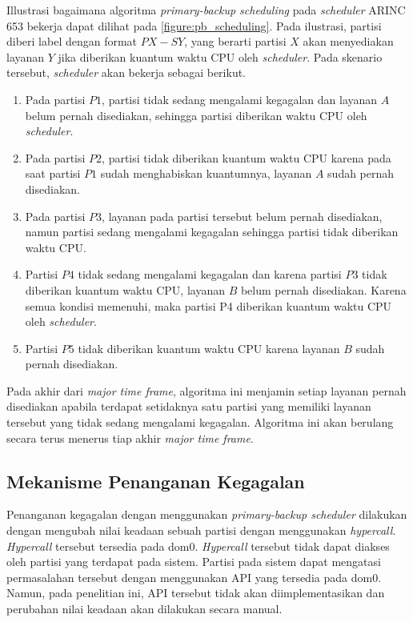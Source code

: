 Illustrasi bagaimana algoritma \textit{primary-backup scheduling} pada \textit{scheduler} ARINC
653 bekerja dapat dilihat pada \autoref{figure:pb_scheduling}. Pada ilustrasi, partisi diberi
label dengan format $PX-SY$, yang berarti partisi $X$ akan menyediakan layanan $Y$ jika
diberikan kuantum waktu CPU oleh \textit{scheduler}. Pada skenario tersebut, \textit{scheduler} akan
bekerja sebagai berikut.

\begin{enumerate}

	\item Pada partisi $P1$, partisi tidak sedang mengalami kegagalan dan
		layanan $A$ belum pernah disediakan, sehingga partisi diberikan waktu
		CPU oleh \textit{scheduler}.

	\item Pada partisi $P2$, partisi tidak diberikan kuantum waktu CPU karena pada saat partisi $P1$
		sudah menghabiskan kuantumnya, layanan $A$ sudah pernah disediakan.

	\item Pada partisi $P3$, layanan pada partisi tersebut belum pernah disediakan,
		namun partisi sedang mengalami kegagalan sehingga partisi tidak diberikan waktu
		CPU.

	\item Partisi $P4$ tidak sedang mengalami kegagalan dan karena partisi $P3$ tidak diberikan
		kuantum waktu CPU, layanan $B$ belum pernah disediakan. Karena semua kondisi
		memenuhi, maka partisi P4 diberikan kuantum waktu CPU oleh \textit{scheduler}.

	\item Partisi $P5$ tidak diberikan kuantum waktu CPU karena layanan $B$ sudah pernah
		disediakan.

\end{enumerate}

Pada akhir dari \textit{major time frame}, algoritma ini menjamin setiap layanan pernah
disediakan apabila terdapat setidaknya satu partisi yang memiliki layanan tersebut yang
tidak sedang mengalami kegagalan. Algoritma ini akan berulang secara terus menerus tiap akhir
\textit{major time frame}.

\subsection{Mekanisme Penanganan Kegagalan}

Penanganan kegagalan dengan menggunakan \textit{primary-backup scheduler} dilakukan dengan
mengubah nilai keadaan sebuah partisi dengan menggunakan \textit{hypercall}. \textit{Hypercall}
tersebut tersedia pada dom0. \textit{Hypercall} tersebut tidak dapat diakses oleh partisi yang
terdapat pada sistem. Partisi pada sistem dapat mengatasi permasalahan tersebut dengan
menggunakan API yang tersedia pada dom0. Namun, pada penelitian ini, API tersebut tidak akan
diimplementasikan dan perubahan nilai keadaan akan dilakukan secara manual.

